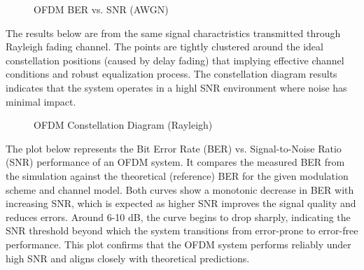 \documentclass[conference]{IEEEtran}
\begin{document}
    
         \begin{figure}[H]
		\centering
    		\caption{OFDM BER vs. SNR (AWGN) }
  	  \end{figure}
    

  The results below are from the same signal charactristics transmitted through Rayleigh fading channel. The points are tightly clustered around the ideal constellation positions (caused by delay fading) that implying effective channel conditions and robust equalization process. The constellation diagram results indicates that the system operates in a highl SNR environment where noise has minimal impact. 

	\begin{figure}[H]
		\centering
    		\caption{OFDM Constellation Diagram  (Rayleigh)}
  	  \end{figure}

The plot below represents the Bit Error Rate (BER) vs. Signal-to-Noise Ratio (SNR) performance of an OFDM system. It compares the measured BER from the simulation against the theoretical (reference) BER for the given modulation scheme and channel model. Both curves show a monotonic decrease in BER with increasing SNR, which is expected as higher SNR improves the signal quality and reduces errors. Around 6-10 dB, the curve begins to drop sharply, indicating the SNR threshold beyond which the system transitions from error-prone to error-free performance. This plot confirms that the OFDM system performs reliably under high SNR and aligns closely with theoretical predictions.
    
\end{document}
